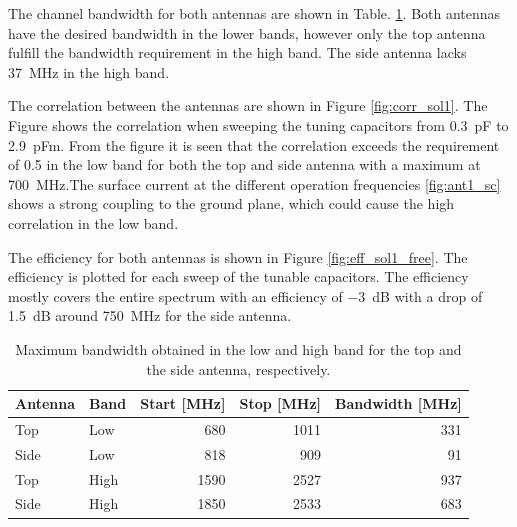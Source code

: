 The channel bandwidth for both antennas are shown in Table. \ref{tab:bw_sol1}. Both antennas have the desired bandwidth in the lower bands, however only the top antenna fulfill the bandwidth requirement in the high band. The side antenna lacks \SI{37}{MHz} in the high band.

The correlation between the antennas are shown in Figure \ref{fig:corr_sol1}. The Figure shows the correlation when sweeping the tuning capacitors from \SI{0.3}{pF} to \SI{2.9}{pF}m. From the figure it is seen that the correlation exceeds the requirement of \num{0.5} in the low band for both the top and side antenna with a maximum at \SI{700}{MHz}.The surface current at the different operation frequencies \ref{fig:ant1_sc} shows a strong coupling to the ground plane, which could cause the high correlation in the low band. 

The efficiency for both antennas is shown in Figure \ref{fig:eff_sol1_free}. The efficiency is plotted for each sweep of the tunable capacitors. The efficiency mostly covers the entire spectrum with an efficiency of \SI{-3}{dB} with a drop of \SI{1.5}{dB} around \SI{750}{MHz} for the side antenna. 

    \begin{table}
        \centering
        \begin{tabular}{|l|l|r|r|r|}
            \hline
            Antenna & Band & Start [MHz] & Stop [MHz] & Bandwidth [MHz] \\
            \hline
            Top     & Low  & 680         & 1011       & 331 \\
            Side    & Low  & 818         & 909        & 91 \\
            \hline
            Top     & High & 1590        & 2527       & 937 \\
            Side    & High & 1850        & 2533       & 683 \\
            \hline
        \end{tabular}
        \caption{Maximum bandwidth obtained in the low and high band for the top and the side antenna, respectively.}
        \label{tab:bw_sol1}
    \end{table}

